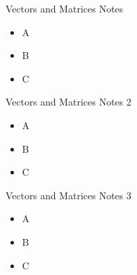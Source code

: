 \begin{frame}{Vectors and Matrices Notes}
    \begin{itemize}
        \item A
        \item B
        \item C
    \end{itemize}
\end{frame}

\begin{frame}{Vectors and Matrices Notes 2}
    \begin{itemize}
        \item A
        \item B
        \item C
    \end{itemize}
\end{frame}

\begin{frame}{Vectors and Matrices Notes 3}
    \begin{itemize}
        \item A
        \item B
        \item C
    \end{itemize}
\end{frame}